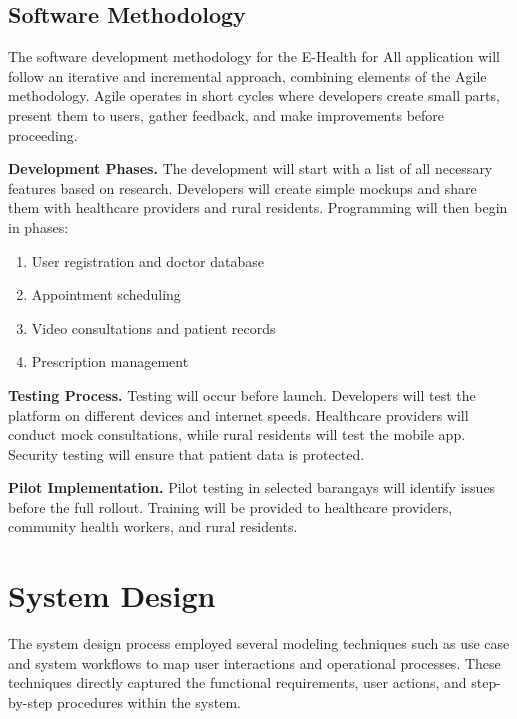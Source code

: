 \documentclass[12pt]{report}
\begin{document}
\subsection*{Software Methodology}

The software development methodology for the E-Health for All application will
follow an iterative and incremental approach, combining elements of the Agile
methodology. Agile operates in short cycles where developers create small parts,
present them to users, gather feedback, and make improvements before proceeding.

\noindent\textbf{Development Phases.} The development will start with a list of all
necessary features based on research. Developers will create simple mockups and
share them with healthcare providers and rural residents. Programming will then
begin in phases:

\begin{enumerate}[label=\arabic*., leftmargin=0.75in, itemsep=2pt, parsep=0pt]
  \item User registration and doctor database
  \item Appointment scheduling
  \item Video consultations and patient records
  \item Prescription management
\end{enumerate}

\noindent\textbf{Testing Process.} Testing will occur before launch. Developers will
test the platform on different devices and internet speeds. Healthcare providers
will conduct mock consultations, while rural residents will test the mobile app.
Security testing will ensure that patient data is protected.

\noindent\textbf{Pilot Implementation.} Pilot testing in selected barangays will
identify issues before the full rollout. Training will be provided to healthcare
providers, community health workers, and rural residents.

\section*{System Design}

The system design process employed several modeling techniques such as use case
and system workflows to map user interactions and operational processes. These
techniques directly captured the functional requirements, user actions, and
step-by-step procedures within the system.
\end{document}
